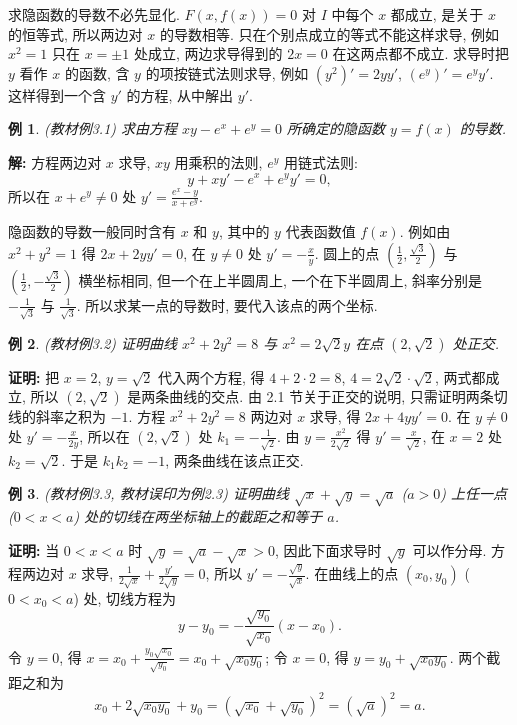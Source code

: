 \documentclass[UTF8,openany]{ctexbook}
\theoremstyle{chinesetextbook}
\newtheorem{example}{例}[section]
\newenvironment{cnproof}{\par\indent\textbf{证明:} \ignorespaces}{\par}
\newenvironment{cnsolution}{\par\indent\textbf{解:} \ignorespaces}{\par}
\begin{document}
求隐函数的导数不必先显化. $F(x,f(x))=0$ 对 $I$ 中每个 $x$ 都成立, 是关于 $x$ 的恒等式, 所以两边对 $x$ 的导数相等. 只在个别点成立的等式不能这样求导, 例如 $x^2=1$ 只在 $x=\pm1$ 处成立, 两边求导得到的 $2x=0$ 在这两点都不成立. 求导时把 $y$ 看作 $x$ 的函数, 含 $y$ 的项按链式法则求导, 例如 $(y^2)'=2yy'$, $(e^y)'=e^yy'$. 这样得到一个含 $y'$ 的方程, 从中解出 $y'$.
\begin{example}\label{ex:c2-3-1}
\textnormal{(教材例3.1)} 求由方程 $xy-e^x+e^y=0$ 所确定的隐函数 $y=f(x)$ 的导数.
\end{example}
\begin{cnsolution}
方程两边对 $x$ 求导, $xy$ 用乘积的法则, $e^y$ 用链式法则:
\[
y+xy'-e^x+e^yy'=0,
\]
所以在 $x+e^y\ne0$ 处 $\displaystyle y'=\frac{e^x-y}{x+e^y}$.
\end{cnsolution}
隐函数的导数一般同时含有 $x$ 和 $y$, 其中的 $y$ 代表函数值 $f(x)$. 例如由 $x^2+y^2=1$ 得 $2x+2yy'=0$, 在 $y\ne0$ 处 $\displaystyle y'=-\frac xy$. 圆上的点 $\displaystyle\left(\frac12,\frac{\sqrt3}2\right)$ 与 $\displaystyle\left(\frac12,-\frac{\sqrt3}2\right)$ 横坐标相同, 但一个在上半圆周上, 一个在下半圆周上, 斜率分别是 $\displaystyle-\frac1{\sqrt3}$ 与 $\displaystyle\frac1{\sqrt3}$. 所以求某一点的导数时, 要代入该点的两个坐标.
\begin{example}\label{ex:c2-3-2}
\textnormal{(教材例3.2)} 证明曲线 $x^2+2y^2=8$ 与 $x^2=2\sqrt2y$ 在点 $(2,\sqrt2)$ 处正交.
\end{example}
\begin{cnproof}
把 $x=2$, $y=\sqrt2$ 代入两个方程, 得 $4+2\cdot2=8$, $4=2\sqrt2\cdot\sqrt2$, 两式都成立, 所以 $(2,\sqrt2)$ 是两条曲线的交点. 由 2.1 节关于正交的说明, 只需证明两条切线的斜率之积为 $-1$. 方程 $x^2+2y^2=8$ 两边对 $x$ 求导, 得 $2x+4yy'=0$. 在 $y\ne0$ 处 $\displaystyle y'=-\frac x{2y}$, 所以在 $(2,\sqrt2)$ 处 $\displaystyle k_1=-\frac1{\sqrt2}$. 由 $\displaystyle y=\frac{x^2}{2\sqrt2}$ 得 $\displaystyle y'=\frac x{\sqrt2}$, 在 $x=2$ 处 $k_2=\sqrt2$. 于是 $k_1k_2=-1$, 两条曲线在该点正交.
\end{cnproof}
\begin{example}\label{ex:c2-3-3}
\textnormal{(教材例3.3, 教材误印为例2.3)} 证明曲线 $\sqrt x+\sqrt y=\sqrt a$ ($a>0$) 上任一点 ($0<x<a$) 处的切线在两坐标轴上的截距之和等于 $a$.
\end{example}
\begin{cnproof}
当 $0<x<a$ 时 $\sqrt y=\sqrt a-\sqrt x>0$, 因此下面求导时 $\sqrt y$ 可以作分母. 方程两边对 $x$ 求导, $\displaystyle\frac1{2\sqrt x}+\frac{y'}{2\sqrt y}=0$, 所以 $\displaystyle y'=-\frac{\sqrt y}{\sqrt x}$. 在曲线上的点 $(x_0,y_0)$ ($0<x_0<a$) 处, 切线方程为
\[
y-y_0=-\frac{\sqrt{y_0}}{\sqrt{x_0}}(x-x_0).
\]
令 $y=0$, 得 $\displaystyle x=x_0+\frac{y_0\sqrt{x_0}}{\sqrt{y_0}}=x_0+\sqrt{x_0y_0}$; 令 $x=0$, 得 $y=y_0+\sqrt{x_0y_0}$. 两个截距之和为
\[
x_0+2\sqrt{x_0y_0}+y_0=\left(\sqrt{x_0}+\sqrt{y_0}\right)^2=\left(\sqrt a\right)^2=a.
\]
\end{cnproof}
\end{document}
